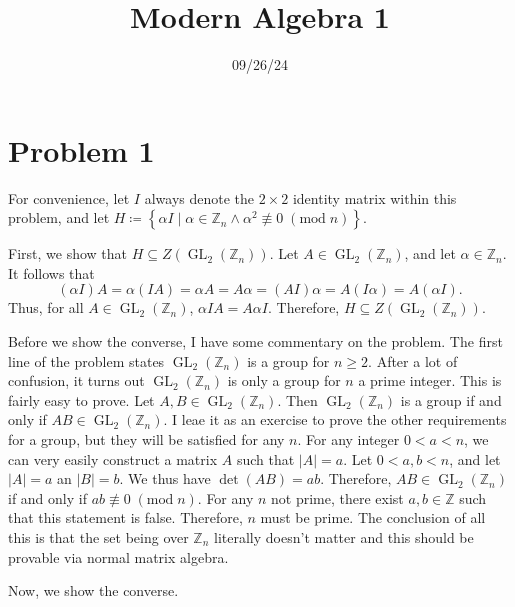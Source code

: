 \documentclass[11pt, letterpaper]{report}
\title{Modern Algebra 1}
\date{09/26/24}
\renewcommand{\mod}[1]{\;(\text{mod}\;#1)}
\begin{document}
\makeproblem
\section*{Problem 1}
\begin{solution}
	For convenience, let $I$ always denote the $2\times 2$ identity matrix within this problem, and let $H\coloneqq \left\{ \alpha I  \mid \alpha \in\mathbb{Z}_n \land \alpha ^2\not\equiv0\mod{n}\right\} $.

	First, we show that $H\subseteq Z(\operatorname{GL}_2(\mathbb{Z}_n)) $. Let $A \in \operatorname{GL}_2(\mathbb{Z}_n) $, and let $\alpha \in\mathbb{Z}_n$. It follows that
	\[
		(\alpha I)A=\alpha (IA)=\alpha A=A\alpha =(AI)\alpha =A(I\alpha )=A(\alpha I)
	.\]
	Thus, for all $A\in \operatorname{GL}_2(\mathbb{Z}_n) $, $\alpha IA=A\alpha I$. Therefore, $H\subseteq Z(\operatorname{GL}_2(\mathbb{Z}_n)) $.

	Before we show the converse, I have some commentary on the problem. The first line of the problem states $\operatorname{GL}_2(\mathbb{Z}_n) $ is a group for $n\geq 2$. After a lot of confusion, it turns out $\operatorname{GL}_2(\mathbb{Z}_n) $ is only a group for $n$ a prime integer. This is fairly easy to prove. Let $A,B\in \operatorname{GL}_2(\mathbb{Z}_n) $. Then $\operatorname{GL}_2(\mathbb{Z}_n) $ is a group if and only if $AB\in \operatorname{GL}_2(\mathbb{Z}_n) $. I leae it as an exercise to prove the other requirements for a group, but they will be satisfied for any $n$. For any integer $0<a<n$, we can very easily construct a matrix $A$ such that $\left| A \right| =a$. Let $0<a,b<n$, and let $\left| A \right| =a$ an $\left| B \right| =b$. We thus have $\det (AB)=ab$. Therefore, $AB\in \operatorname{GL}_2(\mathbb{Z}_n) $ if and only if $ab\not\equiv 0\mod{n}$. For any $n$ not prime, there exist $a,b\in\mathbb{Z}$ such that this statement is false. Therefore, $n$ must be prime. The conclusion of all this is that the set being over $\mathbb{Z}_n$ literally doesn't matter and this should be provable via normal matrix algebra.

Now, we show the converse. 
\end{solution}
\end{document}
